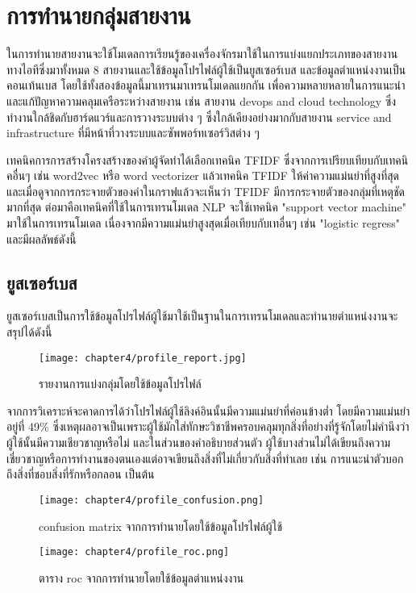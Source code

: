 \section{การทำนายกลุ่มสายงาน}
\label{chapter:result}

ในการทำนายสายงานจะใช้โมเดลการเรียนรู้ของเครื่องจักรมาใช้ในการแบ่งแยกประเภทของสายงานทางไอทีซึ่งมาทั้งหมด 8 สายงานและใช้ข้อมูลโปรไฟล์ผู้ใช้เป็นยูสเซอร์เบส และข้อมูลตำแหน่งงานเป็นคอนเท้นเบส โดยใช้ทั้งสองข้อมูลนี้มาเทรนมาเทรนโมเดลแยกกัน เพื่อความหลายหลายในการแนะนำและแก้ปัญหาความคลุมเครือระหว่างสายงาน เช่น สายงาน devops and cloud technology ซึ่งทำงานใกล้ชิดกับฮาร์ดแวร์และการวางระบบต่าง ๆ ซึ่งใกล้เคียงอย่างมากกับสายงาน service and infrastructure ที่มีหน้าที่วางระบบและซัพพอร์ทเซอร์วิสต่าง ๆ \par
เทคนิคการการสร้างโครงสร้างของคำผู้จัดทำได้เลือกเทคนิค TFIDF ซึ่งจากการเปรียบเทียบกับเทคนิคอื่นๆ เช่น word2vec หรือ word vectorizer แล้วเทคนิค TFIDF ให้ค่าความแม่นยำที่สูงที่สุดและเมื่อดูจากการกระจายตัวของคำในกราฟแล้วจะเห็นว่า TFIDF มีการกระจายตัวของกลุ่มที่เหตุชัดมากที่สุด 
ต่อมาคือเทคนิคที่ใช้ในการเทรนโมเดล NLP จะใช้เทคนิค "support vector machine" มาใช้ในการเทรนโมเดล เนื่องจากมีความแม่นยำสูงสุดเมื่อเทียบกับเทอื่นๆ เช่น "logistic regress" และมีผลลัพธ์ดังนี้

\subsection{ยูสเซอร์เบส}
ยูสเซอร์เบสเป็นการใช้ข้อมูลโปรไฟล์ผู้ใช้มาใช้เป็นฐานในการเทรนโมเดลและทำนายตำแหน่งงานจะสรุปได้ดังนี้

\begin{figure}[!h]
  \centering
  \texttt{[image: chapter4/profile\_report.jpg]}  
  \caption{รายงานการแบ่งกลุ่มโดยใช้ข้อมูลโปรไฟล์}
  \label{Fig:result-profile-group}
\end{figure}
จากการวิเคราะห์จะคาดการได้ว่าโปรไฟล์ผู้ใช้ลิงค์อินนั้นมีความแม่นยำที่ค่อนข้างต่ำ โดยมีความแม่นยำอยู่ที่ 49\% ซึ่งเหตุผลอาจเป็นเพราะผู้ใช้มักใส่ทักษะวิชาชีพครอบคลุมทุกสิ่งที่อย่างที่รู้จักโดยไม่คำนึงว่าผู้ใช้นั้นมีความเชียวชาญหรือไม่ และในส่วนของคำอธิบายส่วนตัว ผู้ใช้บางส่วนไม่ได้เขียนถึงความเชี่ยวชาญหรือการทำงานของตนเองแต่อาจเขียนถึงสิ่งที่ไม่เกี่ยวกับสิ่งที่ทำเลย เช่น การแนะนำตัวบอกถึงสิ่งที่ชอบสิ่งที่รักหรือกลอน เป็นต้น

\begin{figure}[!h]
  \centering
  \texttt{[image: chapter4/profile\_confusion.png]}  
  \caption{confusion matrix จากการทำนายโดยใช้ข้อมูลโปรไฟล์ผู้ใช้}
  \label{Fig:result-profile-group}
\end{figure}
\begin{figure}[!h]
  \centering
  \texttt{[image: chapter4/profile\_roc.png]}  
  \caption{ตาราง roc จากการทำนายโดยใช้ข้อมูลตำแหน่งงาน}
  \label{Fig:result-profile-group}
\end{figure}
\clearpage

